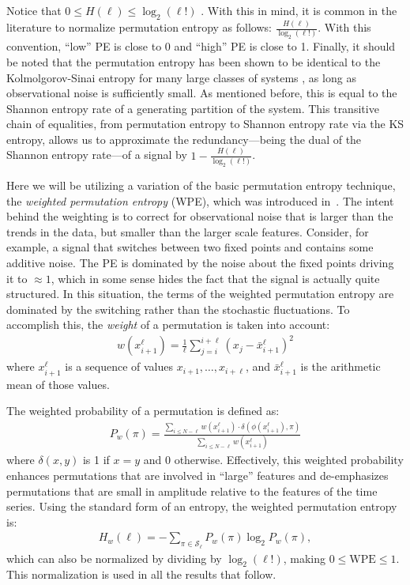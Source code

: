 Notice that $0\le H(\ell) \le \log_2(\ell!)$ \cite{bandt2002per}.
With this in mind, it is common in the literature to normalize
permutation entropy as follows: $\frac{H(\ell)}{\log_2(\ell!)}$.  With
this convention, ``low'' PE is close to 0 and ``high'' PE is close to
1. Finally, it should be noted that the permutation entropy has been
shown to be identical to the Kolmolgorov-Sinai entropy for many large
classes of systems \cite{amigo2012permutation}, as long as
observational noise is sufficiently small. As mentioned before, this
is equal to the Shannon entropy rate of a generating partition of the
system. This transitive chain of equalities, from permutation entropy
to Shannon entropy rate via the KS entropy, allows us to approximate
the redundancy---being the dual of the Shannon entropy rate---of a
signal by $1 - \frac{H(\ell)}{\log_2(\ell!)}$.

Here we will be utilizing a variation of the basic permutation entropy
technique, the \emph{weighted permutation entropy} (WPE), which was
introduced in~\cite{fadlallah2013}.  The intent behind the weighting
is to correct for observational noise that is larger than the trends
in the data, but smaller than the larger scale features.  Consider,
for example, a signal that switches between two fixed points and
contains some additive noise. The PE is dominated by the noise about
the fixed points driving it to $\approx 1$, which in some sense hides
the fact that the signal is actually quite structured.  In this
situation, the terms of the weighted permutation entropy are dominated
by the switching rather than the stochastic fluctuations. To
accomplish this, the \emph{weight} of a permutation is taken into
account:
\begin{align*}
  w(x_{i+1}^\ell) = \frac{1}{\ell} \sum_{j = i}^{i+\ell}
                      \left( x_j - \bar{x}_{i+1}^\ell \right)^2
\end{align*}
where $x_{i+1}^\ell$ is a sequence of values $x_{i+1}, \ldots,
x_{i+\ell}$, and $\bar{x}_{i+1}^\ell$ is the arithmetic mean of
those values.

The weighted probability of a permutation is defined as:
\begin{align*}
  P_w(\pi) = \frac{\displaystyle \sum_{i \le N - \ell} w(x_{i+1}^\ell) \cdot \delta(\phi(x_{i+1}^\ell), \pi) }{\displaystyle \sum_{i \le N - \ell} w(x_{i+1}^\ell)}
\end{align*}
where $\delta(x, y)$ is 1 if $x = y$ and 0 otherwise. Effectively,
this weighted probability enhances permutations that are involved in
``large'' features and de-emphasizes permutations that are small in
amplitude relative to the features of the time series. Using the
standard form of an entropy, the weighted permutation entropy is:
\begin{align*}
  H_w(\ell) = - \sum_{\pi \in \mathcal{S}_\ell} P_w(\pi) \log_2 P_w(\pi),
\end{align*}
which can also be normalized by dividing by $\log_2(\ell!)$, making $0
\le \textrm{WPE} \le 1$.  This normalization is used in all the
results that follow.

